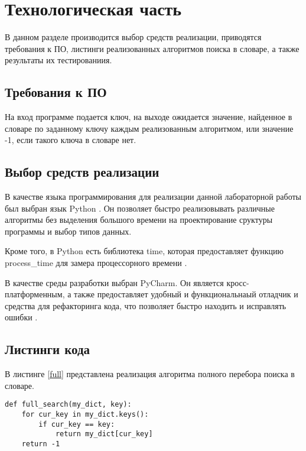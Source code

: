 \chapter{Технологическая часть}

В данном разделе производится выбор средств реализации, приводятся требования к ПО, листинги реализованных алгоритмов поиска в словаре, а также результаты их тестированиия.

\section{Требования к ПО}

На вход программе подается ключ, на выходе ожидается значение, найденное в словаре по заданному ключу каждым реализованным алгоритмом, или значение -1, если такого ключа в словаре нет. 

\section{Выбор средств реализации}

В качестве языка программирования для реализации данной лабораторной работы был выбран язык Python  \cite{PythonBook}. Он позволяет быстро реализовывать различные алгоритмы без выделения большого времени на проектирование сруктуры программы и выбор типов данных. 

Кроме того, в Python есть библиотека time, которая предоставляет функцию process\_time для замера процессорного времени \cite{process_time_text}.

В качестве среды разработки выбран PyCharm. Он является кросс-платформенным, а также предоставляет удобный и функциональнаый отладчик и средства для рефакторинга кода, что позволяет быстро находить и исправлять ошибки \cite{pycharm}.

\section{Листинги кода}

В листинге \ref{full} представлена реализация алгоритма полного перебора поиска в словаре.

\clearpage
\begin{lstlisting}[caption=Алгоритм полного перебора,
	label={full}]
def full_search(my_dict, key):
	for cur_key in my_dict.keys():
		if cur_key == key:
			return my_dict[cur_key]
	return -1
\end{lstlisting}

